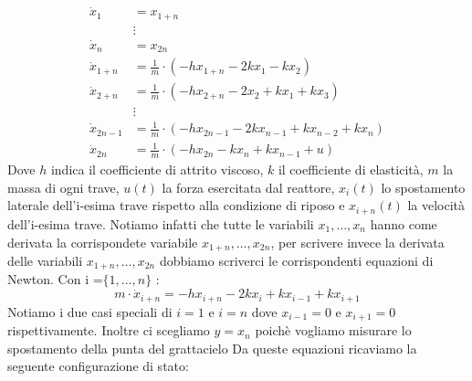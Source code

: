 \documentclass[a4paper]{report}
\begin{document}
\begin{align*}
\dot{x}_1&=x_{1+n}\\
&\vdots\\
\dot{x}_n&=x_{2n}\\
\dot{x}_{1+n}&=\frac{1}{m} \cdot (-hx_{1+n}-2kx_1-kx_2)\\
\dot{x}_{2+n}&=\frac{1}{m} \cdot (-hx_{2+n}-2x_2+kx_1+kx_3)\\
&\vdots\\
\dot{x}_{2n-1}&=\frac{1}{m} \cdot (-hx_{2n-1}-2kx_{n-1}+kx_{n-2}+kx_n)\\
\dot{x}_{2n}&=\frac{1}{m} \cdot (-hx_{2n}-kx_n+kx_{n-1}+u)
\end{align*}
Dove $h$ indica il coefficiente di attrito viscoso, $k$ il  coefficiente di elasticità, $m$ la massa di ogni trave, $u(t)$ la forza esercitata dal reattore, $x_i(t)$ lo spostamento laterale dell’i-esima trave rispetto alla condizione di riposo e $x_{i+n}(t)$ la velocità dell’i-esima trave.
\newline
Notiamo infatti che tutte le variabili $x_1,\dots,x_n$ hanno come derivata la corrispondete variabile $x_{1+n},\dots,x_{2n}$, per scrivere invece la derivata delle variabili $x_{1+n},\dots,x_{2n}$ dobbiamo scriverci le corrispondenti equazioni di Newton. Con i =$\{1,\dots,n\}$ :
\[
  m\cdot\dot{x}_{i+n}=-hx_{i+n}-2kx_i+kx_{i-1}+kx_{i+1}
\]
Notiamo i due casi speciali di $i=1$ e $i=n$ dove $x_{i-1}=0$ e $x_{i+1}=0$ rispettivamente. 
Inoltre ci scegliamo $y=x_n$ poichè vogliamo misurare lo spostamento della punta del grattacielo
\newpage
Da queste equazioni ricaviamo la seguente configurazione di stato:
\end{document}
